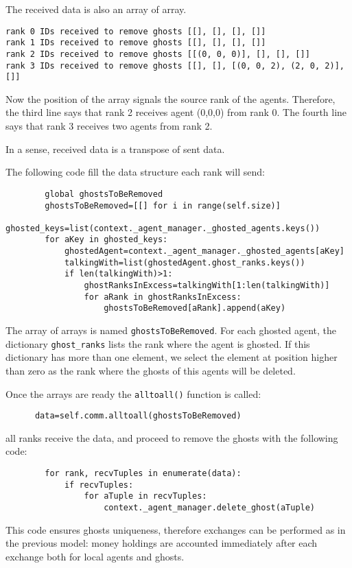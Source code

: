 \documentclass{article}
\begin{document}
The received data is also an array of array.
\begin{verbatim}
rank 0 IDs received to remove ghosts [[], [], [], []]
rank 1 IDs received to remove ghosts [[], [], [], []]
rank 2 IDs received to remove ghosts [[(0, 0, 0)], [], [], []]
rank 3 IDs received to remove ghosts [[], [], [(0, 0, 2), (2, 0, 2)], []]
\end{verbatim}
Now the position of the array signals the source rank of the agents. Therefore, the third line says that rank 2 receives agent (0,0,0) from rank 0. The fourth line says that rank 3 receives two agents from rank 2.

In a sense, received data is a transpose of sent data.

The following code fill the data structure each rank will send:
\begin{verbatim}
        global ghostsToBeRemoved
        ghostsToBeRemoved=[[] for i in range(self.size)]
        ghosted_keys=list(context._agent_manager._ghosted_agents.keys())
        for aKey in ghosted_keys:
            ghostedAgent=context._agent_manager._ghosted_agents[aKey]
            talkingWith=list(ghostedAgent.ghost_ranks.keys())
            if len(talkingWith)>1:
                ghostRanksInExcess=talkingWith[1:len(talkingWith)]
                for aRank in ghostRanksInExcess:
                    ghostsToBeRemoved[aRank].append(aKey)
\end{verbatim}

The array of arrays is named \verb+ghostsToBeRemoved+. For each ghosted agent, the dictionary \verb+ghost_ranks+ lists the rank where the agent is ghosted. If this dictionary has more than one element, we select the element at position higher than zero as the rank where the ghosts of this agents will be deleted.

Once the arrays are ready the \verb+alltoall()+ function is called:
\begin{verbatim}
      data=self.comm.alltoall(ghostsToBeRemoved)
\end{verbatim}
all ranks receive the data, and proceed to remove the ghosts with the following code:
\begin{verbatim}
        for rank, recvTuples in enumerate(data):
            if recvTuples:
                for aTuple in recvTuples:
                    context._agent_manager.delete_ghost(aTuple)
\end{verbatim}


This code ensures ghosts uniqueness, therefore exchanges can be performed as in the previous model: money holdings are accounted
immediately after each exchange both for local agents and ghosts.
\end{document}
